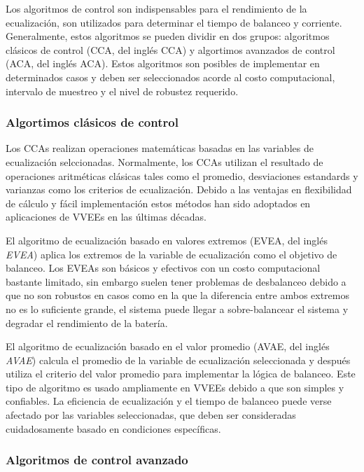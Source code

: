 Los algoritmos de control son indispensables para el rendimiento de la
ecualizaci\'on, son utilizados para determinar el tiempo de balanceo y
corriente. Generalmente, estos algoritmos se pueden dividir en dos grupos:
algoritmos cl\'asicos de control (\acrshort{CCA}, del ingl\'es \acrlong{CCA}) y
algortimos avanzados de control (\acrshort{ACA}, del ingl\'es \acrlong{ACA}).
Estos algoritmos son posibles de implementar en determinados casos y deben ser
seleccionados acorde al costo computacional, intervalo de muestreo y el nivel de
robustez requerido.

\subsubsection{Algortimos cl\'asicos de control}

Los \acrshort{CCA}s realizan operaciones matem\'aticas basadas en las variables
de ecualizaci\'on selccionadas. Normalmente, los \acrshort{CCA}s utilizan el
resultado de operaciones aritm\'eticas cl\'asicas tales como el promedio,
desviaciones estandards y varianzas como los criterios de ecualizaci\'on. Debido
a las ventajas en flexibilidad de c\'alculo y f\'acil implementaci\'on estos
m\'etodos han sido adoptados en aplicaciones de \acrshort{VVEE}s en las
\'ultimas d\'ecadas.

El algoritmo de ecualizaci\'on basado en valores extremos (\acrshort{EVEA}, del
ingl\'es \emph{\acrlong{EVEA}}) aplica los extremos de la variable de ecualizaci\'on
como el objetivo de balanceo. Los \acrshort{EVEA}s son b\'asicos y efectivos con 
un costo computacional bastante limitado, sin embargo suelen tener problemas de
desbalanceo debido a que no son robustos en casos como en la que la diferencia
entre ambos extremos no es lo suficiente grande, el sistema puede llegar a
sobre-balancear el sistema y degradar el rendimiento de la bater\'ia.

El algoritmo de ecualizaci\'on basado en el valor promedio (\acrshort{AVAE}, del
ingl\'es \emph{\acrlong{AVAE}}) calcula el promedio de la variable de
ecualizaci\'on seleccionada y despu\'es utiliza el criterio del valor promedio
para implementar la l\'ogica de balanceo. Este tipo de algoritmo es usado
ampliamente en \acrshort{VVEE}s debido a que son simples y confiables. La
eficiencia de ecualizaci\'on y el tiempo de balanceo puede verse afectado por
las variables seleccionadas, que deben ser consideradas cuidadosamente basado en
condiciones espec\'ificas.

\subsubsection{Algoritmos de control avanzado}

